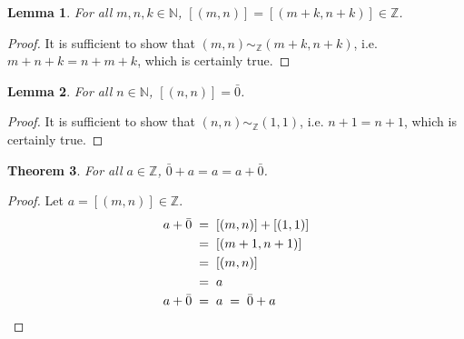 \documentclass[10pt]{article}
\newtheorem{theorem}{Theorem}[section]
\newtheorem{lemma}[theorem]{Lemma}
\theoremstyle{definition}
\theoremstyle{remark}
\begin{document}
        \begin{lemma}
                For all $m, n, k \in \mathbb{N}$, $[(m, n)] = [(m + k, n + k)] \in \mathbb{Z}$.
        \end{lemma}
        \begin{proof}
                It is sufficient to show that $(m, n) \sim_{\mathbb{Z}} (m + k, n + k)$, i.e.
                $m + n + k = n + m + k$, which is certainly true.
        \end{proof}
        \begin{lemma}
                For all $n \in \mathbb{N}$, $[(n, n)] = \bar{0}$.
        \end{lemma}
        \begin{proof}
                It is sufficient to show that $(n, n) \sim_{\mathbb{Z}} (1, 1)$, i.e.
                $n + 1 = n + 1$, which is certainly true.
        \end{proof}

        \begin{theorem}
                For all $a \in \mathbb{Z}$, $\bar{0} + a = a = a + \bar{0}$.
        \end{theorem}
        \begin{proof}
                Let $a = [(m, n)] \in \mathbb{Z}$.
                \begin{align*}
                        a + \bar{0} \;&=\; [(m, n)] + [(1, 1)] \\
                                \;&=\; [(m + 1, n + 1)] \\
                                \;&=\; [(m, n)] \\
                                \;&=\; a \\
                        a + \bar{0} \;&=\; a \;=\; \bar{0} + a \qedhere
                \end{align*}
        \end{proof}
        
\end{document}
